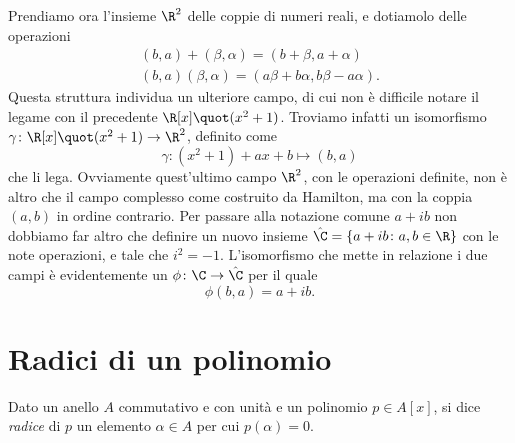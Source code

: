 Prendiamo ora l'insieme $\R^2$ delle coppie di numeri reali, e dotiamolo delle operazioni
\begin{equation}
	\begin{gathered}
		(b,a)+(\beta,\alpha)=(b+\beta,a+\alpha)\\
		(b,a)(\beta,\alpha)=(a\beta+b\alpha, b\beta-a\alpha).
	\end{gathered}
\end{equation}
Questa struttura individua un ulteriore campo, di cui non è difficile notare il legame con il precedente $\R[x]\quot (x^2+1)$.
Troviamo infatti un isomorfismo $\gamma\colon\R[x]\quot(x^2+1)\to\R^2$, definito come
\begin{equation}
	\gamma\colon (x^2+1)+ax+b\mapsto (b,a)
\end{equation}
che li lega.
Ovviamente quest'ultimo campo $\R^2$, con le operazioni definite, non è altro che il campo complesso come costruito da Hamilton, ma con la coppia $(a,b)$ in ordine contrario.
Per passare alla notazione comune $a+ib$ non dobbiamo far altro che definire un nuovo insieme $\hat{\C}=\{a+ib\colon a,b\in\R\}$ con le note operazioni, e tale che $i^2=-1$.
L'isomorfismo che mette in relazione i due campi è evidentemente un $\phi\colon\C\to\hat{\C}$ per il quale
\begin{equation}
	\phi(b,a)=a+ib.
\end{equation}
\section{Radici di un polinomio}
\begin{definizione} \label{d:radice-polinomio}
	Dato un anello $A$ commutativo e con unità e un polinomio $p\in A[x]$, si dice \emph{radice} di $p$ un elemento $\alpha\in A$ per cui $p(\alpha)=0$.
\end{definizione}

